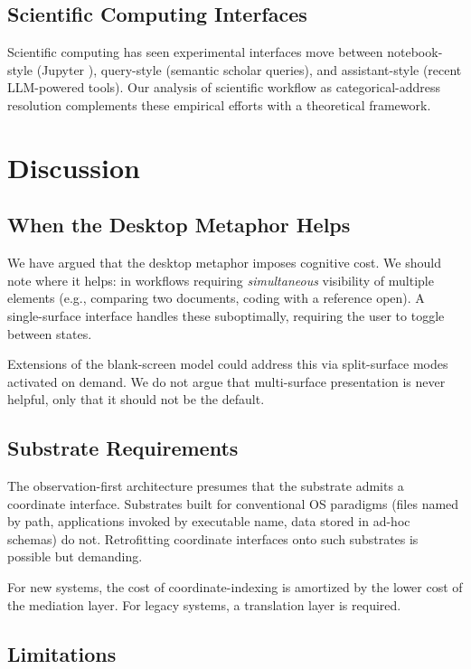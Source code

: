 \documentclass[11pt,a4paper]{article}
\theoremstyle{definition}
\theoremstyle{remark}
\begin{document}
\subsection{Scientific Computing Interfaces}

Scientific computing has seen experimental interfaces move between notebook-style (Jupyter \citep{kluyver2016jupyter}), query-style (semantic scholar queries), and assistant-style (recent LLM-powered tools). Our analysis of scientific workflow as categorical-address resolution complements these empirical efforts with a theoretical framework.

\section{Discussion}
\label{sec:discussion}

\subsection{When the Desktop Metaphor Helps}

We have argued that the desktop metaphor imposes cognitive cost. We should note where it helps: in workflows requiring \emph{simultaneous} visibility of multiple elements (e.g., comparing two documents, coding with a reference open). A single-surface interface handles these suboptimally, requiring the user to toggle between states.

Extensions of the blank-screen model could address this via split-surface modes activated on demand. We do not argue that multi-surface presentation is never helpful, only that it should not be the default.

\subsection{Substrate Requirements}

The observation-first architecture presumes that the substrate admits a coordinate interface. Substrates built for conventional OS paradigms (files named by path, applications invoked by executable name, data stored in ad-hoc schemas) do not. Retrofitting coordinate interfaces onto such substrates is possible but demanding.

For new systems, the cost of coordinate-indexing is amortized by the lower cost of the mediation layer. For legacy systems, a translation layer is required.

\subsection{Limitations}
\end{document}
